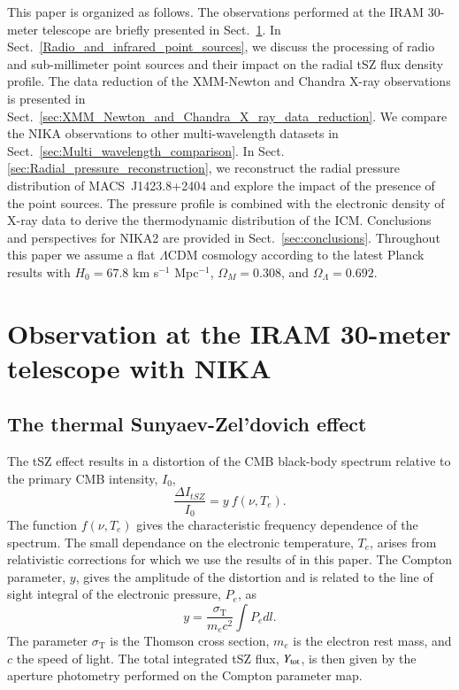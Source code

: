 \documentclass[twocolumn,traditabstract]{aa}
\begin{document}
This paper is organized as follows. The observations performed at the IRAM 30-meter telescope are briefly presented in Sect.~\ref{sec:Observation_at_the_IRAM_30m_telescope_with_NIKA}. In Sect.~\ref{Radio_and_infrared_point_sources}, we discuss the processing of radio and sub-millimeter point sources and their impact on the radial tSZ flux density profile. 
The data reduction of the XMM-Newton and Chandra X-ray observations is presented in Sect.~\ref{sec:XMM_Newton_and_Chandra_X_ray_data_reduction}. We compare the NIKA observations to other multi-wavelength datasets in Sect.~\ref{sec:Multi_wavelength_comparison}. In Sect. \ref{sec:Radial_pressure_reconstruction}, we reconstruct the radial pressure distribution of \mbox{MACS~J1423.8+2404} and explore the impact of the presence of the point sources. The pressure profile is combined with the electronic density of X-ray data to derive the thermodynamic distribution of the ICM. Conclusions and perspectives for NIKA2 are provided in Sect.~\ref{sec:conclusions}. Throughout this paper we assume a flat $\Lambda$CDM cosmology according to the latest Planck results \citep{planck2014param} with $H_0 = 67.8$ km s$^{-1}$ Mpc$^{-1}$, $\Omega_M = 0.308$, and $\Omega_{\Lambda} = 0.692$.

\section{Observation at the IRAM 30-meter telescope with NIKA}\label{sec:Observation_at_the_IRAM_30m_telescope_with_NIKA}
\subsection{The thermal Sunyaev-Zel'dovich effect}
The tSZ effect \citep{sunyaev1972,sunyaev1980} results in a distortion of the CMB black-body spectrum relative to the primary CMB intensity, $I_0$, \citep[e.g.][]{birkinshaw1999}
\begin{equation}
	\frac{\Delta I_{tSZ}}{I_0} = y \ f(\nu, T_e).
\label{eq:deltaI}
\end{equation}
The function $f(\nu, T_e)$ gives the characteristic frequency dependence of the spectrum. The small dependance on the electronic temperature, $T_e$, arises from relativistic corrections for which we use the results of \cite{itoh1998} in this paper. The Compton parameter, $y$, gives the amplitude of the distortion and is related to the line of sight integral of the electronic pressure, $P_e$, as 
\begin{equation}
	y = \frac{\sigma_{\mathrm{T}}}{m_{e} c^2} \int P_{e} dl.
	\label{eq:y_compton}
\end{equation}
The parameter $\sigma_{\mathrm{T}}$ is the Thomson cross section, $m_{e}$ is the electron rest mass, and $c$ the speed of light. The total integrated tSZ flux, $Y_{\rm tot}$, is then given by the aperture photometry performed on the Compton parameter map.
\end{document}
